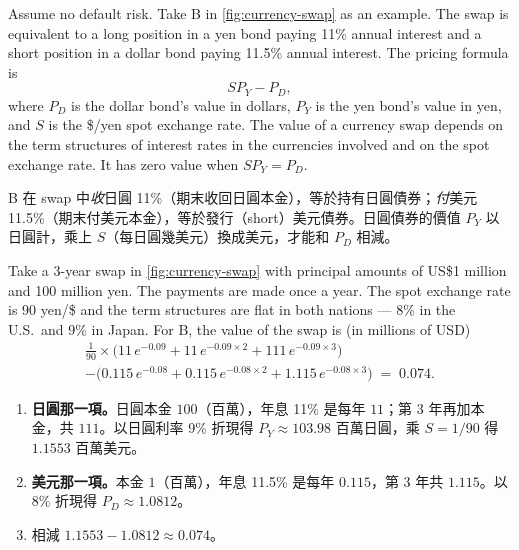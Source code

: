 
Assume no default risk.
Take B in \autoref{fig:currency-swap} as an example.
The swap is equivalent to a long position in a yen bond paying 11\% annual interest and a short position in a dollar bond paying 11.5\% annual interest.
The pricing formula is
\[
	SP_{Y}-P_{D} ,
\]
where $P_{D}$ is the dollar bond's value in dollars, $P_{Y}$ is the yen bond's value in yen, and $S$ is the \$/yen spot exchange rate.
The value of a currency swap depends on the term structures of interest rates in the currencies involved and on the spot exchange rate.
It has zero value when $SP_{Y}=P_{D}$.

\suppstart
{}

\begin{remark}
	B 在 swap 中\emph{收}日圓 11\%（期末收回日圓本金），等於持有日圓債券；\emph{付}美元 11.5\%（期末付美元本金），等於發行（short）美元債券。日圓債券的價值 $P_{Y}$ 以日圓計，乘上 $S$（每日圓幾美元）換成美元，才能和 $P_{D}$ 相減。
\end{remark}
\suppend

\begin{eg}
	\label{eg:swap-value}
	Take a 3-year swap in \autoref{fig:currency-swap} with principal amounts of US\$1 million and 100 million yen.
	The payments are made once a year.
	The spot exchange rate is 90 yen/\$ and the term structures are flat in both nations --- 8\% in the U.S.\ and 9\% in Japan.
	For B, the value of the swap is (in millions of USD)
	\begin{multline*}
		\frac{1}{90}\times\bigl(11\,e^{-0.09}+11\,e^{-0.09\times2}+111\,e^{-0.09\times3}\bigr) \\
		-\bigl(0.115\,e^{-0.08}+0.115\,e^{-0.08\times2}+1.115\,e^{-0.08\times3}\bigr)
		\;=\; 0.074 .
	\end{multline*}
\end{eg}

\suppstart
{}

\begin{remark}
	\begin{enumerate}[(1),nosep]
		\item \textbf{日圓那一項。}日圓本金 $100$（百萬），年息 11\% 是每年 $11$；第 3 年再加本金，共 $111$。以日圓利率 9\% 折現得 $P_{Y}\approx103.98$ 百萬日圓，乘 $S=1/90$ 得 $1.1553$ 百萬美元。
		\item \textbf{美元那一項。}本金 $1$（百萬），年息 11.5\% 是每年 $0.115$，第 3 年共 $1.115$。以 8\% 折現得 $P_{D}\approx1.0812$。
		\item 相減 $1.1553-1.0812\approx0.074$。
	\end{enumerate}
\end{remark}
\suppend

